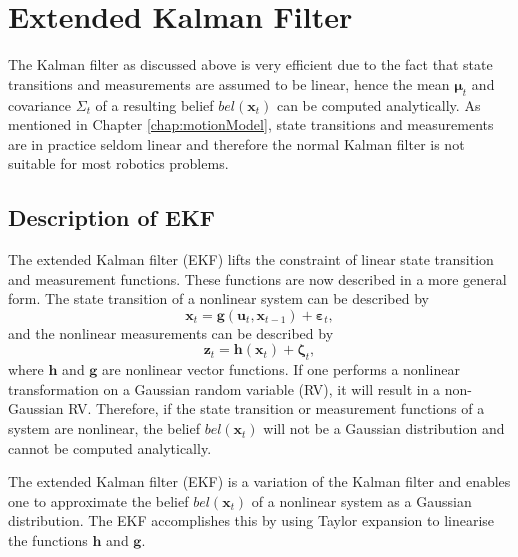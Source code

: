 \documentclass[12pt,oneside,openany,a4paper, %
afrikaans,english,
]{memoir}
\numberwithin{equation}{chapter}
\begin{document}
\section{Extended Kalman Filter}
The Kalman filter as discussed above is very efficient due to the fact that state transitions and measurements are assumed to be linear, hence the mean $\bm{\mu}_t$ and covariance $\Sigma_t$ of a resulting belief $bel(\bm{x}_t)$ can be computed analytically.
As mentioned in Chapter \ref{chap:motionModel}, state transitions and measurements are in practice seldom linear and therefore the normal Kalman filter is not suitable for most robotics problems. 

\subsection{Description of EKF}
The extended Kalman filter (EKF) lifts the constraint of linear state transition and measurement functions. These functions are now described in a more general form. The state transition of a nonlinear system can be described by
\begin{equation}
\bm{x}_t = \bm{g}(\bm{u}_t, \bm{x}_{t-1}) + \bm{\varepsilon}_t,
\end{equation}
and the nonlinear measurements can be described by
\begin{equation}
\bm{z}_t = \bm{h}(\bm{x}_t) + \bm{\zeta}_t,
\end{equation}
where $\bm{h}$ and $\bm{g}$ are nonlinear vector functions. If one performs a nonlinear transformation on a Gaussian random variable (RV), it will result in a non-Gaussian RV. Therefore, if the state transition or measurement functions of a system are nonlinear, the belief $bel(\bm{x}_t)$ will not be a Gaussian distribution and cannot be computed analytically.

The extended Kalman filter (EKF) is a variation of the Kalman filter and enables one to approximate the belief $bel({\bm{x}_t})$ of a nonlinear system as a Gaussian distribution. The EKF accomplishes this by using Taylor expansion to linearise the functions $\bm{h}$ and $\bm{g}$.
\end{document}
